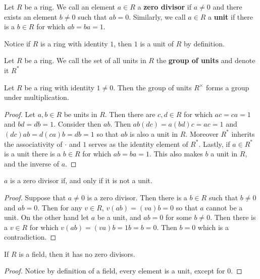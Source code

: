 \begin{definition}
    Let $R$ be a ring. We call an element  $a \in R$ a  \textbf{zero divisor} if
    $a \neq 0$ and there exists an element  $b \neq 0$ such that  $ab=0$.
    Similarly, we call $a \in R$ a \textbf{unit} if there is a $b \in R$ for
    which  $ab=ba=1$.
\end{definition}

\begin{example}\label{1.2}
    Notice if $R$ is a ring with identity $1$, then $1$ is a unit of $R$ by
    definition.
\end{example}

\begin{definition}
    Let $R$ be a ring. We call the set of all units in  $R$ the  \textbf{group
    of units} and denote it $R^\ast$
\end{definition}

\begin{lemma}\label{1.1.3}
    Let $R$ be a ring with identity $1 \neq 0$. Then the group of units
    $R^\times$ forms a group under multiplication.
\end{lemma}
\begin{proof}
    Let $a,b \in R$ be units in $R$. Then there are $c,d \in R$ for which
    $ac=ca=1$ and  $bd=db=1$. Consider then $ab$. Then  $ab(dc)=a(bd)c=ac=1$ and
    $(dc)ab=d(ca)b=db=1$ so that $ab$ is also a unit in $R$. Moreover $R^\ast$
    inherits the associativity of  $\cdot$ and $1$ serves as the identity
    element of $R^\ast$. Lastly, if $a \in R^\ast$ is a unit there is a $b
    \in R$ for which $ab=ba=1$. This also makes $b$ a unit in $R$, and the
    inverse of $a$.
\end{proof}
\begin{corollary}
    $a$ is a zero divisor if, and only if it is not a unit.
\end{corollary}
\begin{proof}
    Suppose that $a \neq 0$ is a zero divisor. Then there is a  $b \in R$ such
    that $b \neq 0$ and $ab=0$. Then for any $v \in R$,  $v(ab)=(va)b=0$ so that
    $a$ cannot be a unit. On the other hand let  $a$ be a unit, and  $ab=0$ for
    some  $b \neq 0$. Then there is a  $v \in R$ for which
    $v(ab)=(va)b=1b=b=0$. Then $b=0$ which is a contradiction.
\end{proof}
\begin{corollary}
    If $R$ is a field, then it has no zero divisors.
\end{corollary}
\begin{proof}
    Notice by definition of a field, every element is a unit, except for $0$.
\end{proof}

